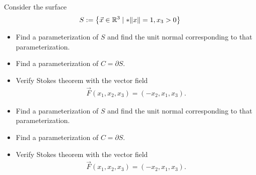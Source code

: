\documentclass[11pt]{article}
\begin{document}
\begin{exercise}
    Consider the surface 
    \begin{align*}
        S := \left\{ \vec x \in \bbR^{3} \suchthat* \|x\| = 1, x_3 > 0 \right\}
    \end{align*}
    \begin{itemize}
     \item Find a parameterization of $S$ and find the unit normal corresponding to that parameterization.
     \item Find a parameterization of $C = \partial S$.
     \item Verify Stokes theorem with the vector field 
     \begin{align*}
        \vec F(x_1,x_2,x_3) = ( -x_2, x_1, x_3 ).
     \end{align*}   
    \end{itemize}
\end{exercise}
\begin{solution}     
    \begin{itemize}
     \item Find a parameterization of $S$ and find the unit normal corresponding to that parameterization.
     \item Find a parameterization of $C = \partial S$.
     \item Verify Stokes theorem with the vector field 
     \begin{align*}
        \vec F(x_1,x_2,x_3) = ( -x_2, x_1, x_3 ).
     \end{align*}   
    \end{itemize}
\end{solution}
\end{document}
